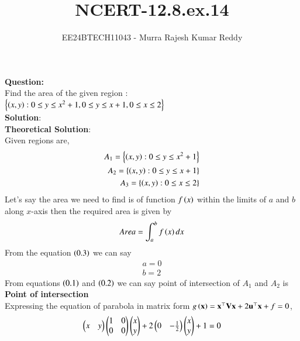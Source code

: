 \documentclass[journal]{IEEEtran}
\begin{document}

\vspace{3cm}

\title{NCERT-12.8.ex.14}
\author{EE24BTECH11043 - Murra Rajesh Kumar Reddy}

{\let\newpage\relax\maketitle}

\renewcommand{\thefigure}{\theenumi}
\renewcommand{\thetable}{\theenumi}
\setlength{\intextsep}{10pt} %


\renewcommand{\thetable}{\theenumi}
\textbf{Question:} \\
Find the area of the given region : \\
$\left\{\left(x,y\right):0 \le y \le x^2+1, 0 \le y \le x+1, 0 \le x \le 2 \right\}$ \\
\textbf{Solution}: \\
\textbf{Theoretical Solution}: \\
Given regions are,
\begin{align}
A_1 = \left\{\left(x,y\right):0 \le y \le x^2+1\right\} \\
A_2 = \left\{\left(x,y\right): 0 \le y \le x+1\right\} \\
A_3 = \left\{\left(x,y\right): 0 \le x \le 2\right\}
\end{align}
Let's say the area we need to find is of function $f\left(x\right)$ within the limits of $a$ and $b$ along $x$-axis then the required area is given by
\begin{align}
	Area = \int_{a}^{b} f\left(x\right) dx
\end{align}
From the equation $\left(0.3\right)$ we can say 
\begin{align}
	a = 0 \\
	b = 2
\end{align}
From equations  $\left(0.1\right)$ and $\left(0.2\right)$ we can say point of intersection of $A_1$ and $A_2$ is
\textbf{Point of intersection}\\
Expressing the equation of parabola in matrix form $g\left(\mathbf{x}\right)= \mathbf{x}^{\top}\mathbf{V}\mathbf{x}+2\mathbf{u}^{\top}\mathbf{x}+f=0$,
\begin{align}
  \begin{pmatrix}x&y\end{pmatrix}\begin{pmatrix}1&0\\0&0\end{pmatrix}\begin{pmatrix}x\\y\end{pmatrix}+2\begin{pmatrix}0 & -\frac{1}{2}\end{pmatrix}\begin{pmatrix}x\\y\end{pmatrix}+1=0
\end{align}
\end{document}
